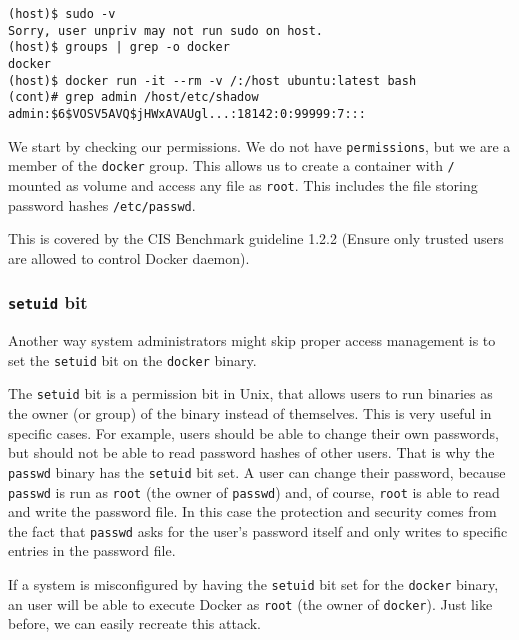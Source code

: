 \begin{lstlisting}[caption={Docker \lstinline{group} exploit example.},captionpos=b,label={listing:docker-group}]
(host)$ sudo -v
Sorry, user unpriv may not run sudo on host.
(host)$ groups | grep -o docker
docker
(host)$ docker run -it --rm -v /:/host ubuntu:latest bash
(cont)# grep admin /host/etc/shadow
admin:$6$VOSV5AVQ$jHWxAVAUgl...:18142:0:99999:7:::
\end{lstlisting}

We start by checking our permissions. We do not have \lstinline{permissions}, but we are a member of the \lstinline{docker} group. This allows us to create a container with \lstinline{/} mounted as volume and access any file as \lstinline{root}. This includes the file storing password hashes \lstinline{/etc/passwd}.

\hfill

This is covered by the CIS Benchmark guideline 1.2.2 (Ensure only trusted users are allowed to control Docker daemon).

\subsubsection{\texorpdfstring{\lstinline{setuid}}{setuid} bit}
Another way system administrators might skip proper access management is to set the \lstinline{setuid} bit on the \lstinline{docker} binary.

\hfill

The \lstinline{setuid} bit is a permission bit in Unix, that allows users to run binaries as the owner (or group) of the binary instead of themselves.
This is very useful in specific cases. For example, users should be able to change their own passwords, but should not be able to read password hashes of other users. That is why the \lstinline{passwd} binary has the \lstinline{setuid} bit set. A user can change their password, because \lstinline{passwd} is run as \lstinline{root} (the owner of \lstinline{passwd}) and, of course, \lstinline{root} is able to read and write the password file. In this case the protection and security comes from the fact that \lstinline{passwd} asks for the user's password itself and only writes to specific entries in the password file.

\hfill

If a system is misconfigured by having the \lstinline{setuid} bit set for the \lstinline{docker} binary, an user will be able to execute Docker as \lstinline{root} (the owner of \lstinline{docker}). Just like before, we can easily recreate this attack.


